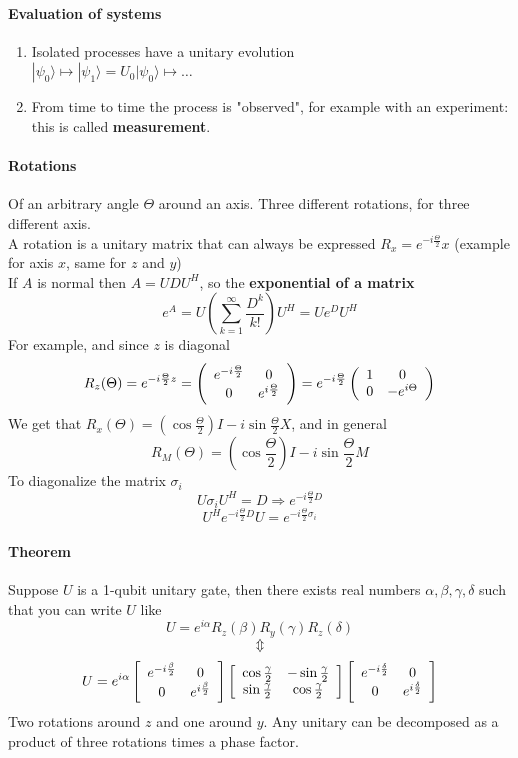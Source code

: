 \documentclass[10pt]{report}
\begin{document}
\paragraph{Evaluation of  systems}
\begin{enumerate}
	\item Isolated processes have a unitary evolution\\
	$|\psi_0\rangle\mapsto|\psi_1\rangle = U_0|\psi_0\rangle\mapsto\ldots$
	\item From time to time the process is "observed", for example with an experiment: this is called \textbf{measurement}.
\end{enumerate}
\paragraph{Rotations} Of an arbitrary angle $\Theta$ around an axis. Three different rotations, for three different axis.\\
A rotation is a unitary matrix that can always be expressed $R_x = e^{-i\frac{\Theta}{2}}x$ (example for axis $x$, same for $z$ and $y$)\\
If $A$ is normal then $A = UDU^H$, so the \textbf{exponential of a matrix} $$e^A = U\left(\sum_{k=1}^\infty \frac{D^{k}}{k!}\right) U^H = Ue^DU^H$$
For example, and since $z$ is diagonal $$R_z(\Theta) = e^{-i\frac{\Theta}{2}z} = \left(\begin{array}{c c}
e^{-i\frac{\Theta}{2}} & 0\\
0 & e^{i\frac{\Theta}{2}}
\end{array}\right) = e^{-i\frac{\Theta}{2}}\left(\begin{array}{c c}
1 & 0\\
0 & -e^{i\Theta}
\end{array}\right)$$
We get that $R_x(\Theta)=(\cos\frac{\Theta}{2})I - i\sin\frac{\Theta}{2}X$, and in general $$R_M(\Theta)=\left(\cos\frac{\Theta}{2}\right)I - i\sin\frac{\Theta}{2}M$$
To diagonalize the matrix $\sigma_i$
$$U\sigma_i U^H = D \Rightarrow e^{-i\frac{\Theta}{2}D}$$
$$U^He^{-i\frac{\Theta}{2}D}U = e^{-i\frac{\Theta}{2}\sigma_i}$$
\paragraph{Theorem} Suppose $U$ is a 1-qubit unitary gate, then there exists real numbers $\alpha,\beta,\gamma,\delta$ such that you can write $U$ like $$U=e^{i\alpha}R_z(\beta)R_y(\gamma)R_z(\delta)$$
$$\Updownarrow$$
$$U = e^{i\alpha}\left[\begin{array}{c c}
e^{-i\frac{\beta}{2}}&0\\0&e^{i\frac{\beta}{2}}
\end{array}\right]\left[\begin{array}{c c}
\cos\frac{\gamma}{2}&-\sin\frac{\gamma}{2}\\\sin\frac{\gamma}{2}&\cos\frac{\gamma}{2}
\end{array}\right]\left[\begin{array}{c c}
e^{-i\frac{\delta}{2}}&0\\0&e^{i\frac{\delta}{2}}
\end{array}\right]$$
Two rotations around $z$ and one around $y$. Any unitary can be decomposed as a product of three rotations times a phase factor.
\end{document}

